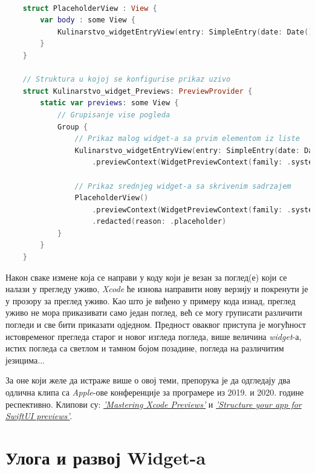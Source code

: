 \documentclass[12pt,oneside]{memoir}
\begin{document}
\begin{lstlisting}[caption=\textit{{Xcode - преглед уживо}}, label={lst:Xcode - преглед уживо}, language=Swift, frame=single]
    
    struct PlaceholderView : View {
        var body : some View {
            Kulinarstvo_widgetEntryView(entry: SimpleEntry(date: Date(), configuration: ConfigurationIntent(), recipe: RecipeModel.testData[0]))
        }
    }
    
    // Struktura u kojoj se konfigurise prikaz uzivo
    struct Kulinarstvo_widget_Previews: PreviewProvider {
        static var previews: some View {
            // Grupisanje vise pogleda
            Group {
                // Prikaz malog widget-a sa prvim elementom iz liste
                Kulinarstvo_widgetEntryView(entry: SimpleEntry(date: Date(), configuration: ConfigurationIntent(), recipe: RecipeModel.testData[0]))
                    .previewContext(WidgetPreviewContext(family: .systemSmall))
                
                // Prikaz srednjeg widget-a sa skrivenim sadrzajem
                PlaceholderView()
                    .previewContext(WidgetPreviewContext(family: .systemMedium))
                    .redacted(reason: .placeholder)
            }
        }
    }    
\end{lstlisting}

\indent Након сваке измене која се направи у коду који је везан за поглед(е) који се налази у прегледу уживо, \textit{Xcode} ће изнова направити нову верзију и покренути је у прозору за преглед уживо. Као што је виђено у примеру кода изнад, преглед уживо не мора приказивати само један поглед, већ се могу груписати различити погледи и све бити приказати одједном. Предност оваквог приступа је могућност истовременог прегледа старог и новог изгледа погледа, више величина \textit{widget}-а, истих погледа са светлом и тамном бојом позадине, погледа на различитим језицима...


\indent За оне који желе да истраже више о овој теми, препорука је да одгледају два одлична клипа са \textit{Apple}-ове конференције за програмере из 2019. и 2020. године респективно. Клипови су: \href{https://developer.apple.com/videos/play/wwdc2019/233/}{\textit{'Mastering Xcode Previews'}} и \href{https://developer.apple.com/videos/play/wwdc2020/10149/}{\textit{'Structure your app for SwiftUI previews'}}.

\chapter{Улога и развој Widget-a}
\end{document}
